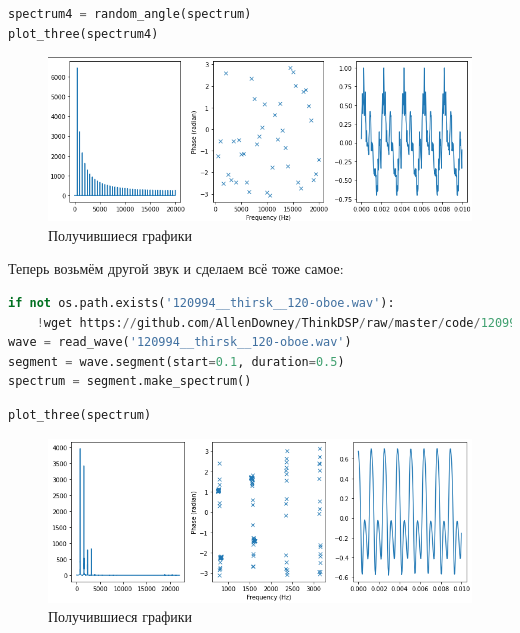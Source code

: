 \begin{lstlisting}[language=Python]
spectrum4 = random_angle(spectrum)
plot_three(spectrum4)
\end{lstlisting}
\begin{figure}[H]
	\begin{center}
		\includegraphics[scale=0.66]{fig/lab06/lab6_9.png}
		\caption{Получившиеся графики}
	\end{center}
\end{figure}

Теперь возьмём другой звук и сделаем всё тоже самое:

\begin{lstlisting}[language=Python]
if not os.path.exists('120994__thirsk__120-oboe.wav'):
    !wget https://github.com/AllenDowney/ThinkDSP/raw/master/code/120994__thirsk__120-oboe.wav
wave = read_wave('120994__thirsk__120-oboe.wav')
segment = wave.segment(start=0.1, duration=0.5)
spectrum = segment.make_spectrum()
\end{lstlisting}

\begin{lstlisting}[language=Python]
plot_three(spectrum)
\end{lstlisting}
\begin{figure}[H]
	\begin{center}
		\includegraphics[scale=0.66]{fig/lab06/lab6_10.png}
		\caption{Получившиеся графики}
	\end{center}
\end{figure}

